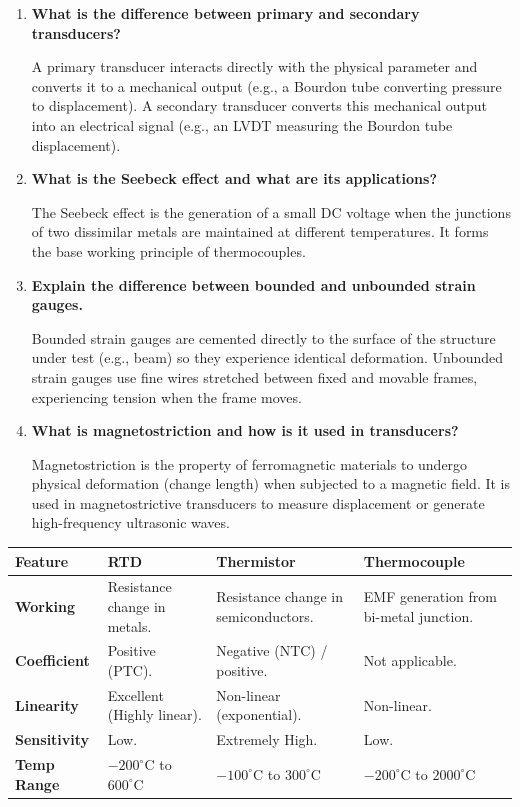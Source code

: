\documentclass[12pt,a4paper]{article}
\newcommand{\Q}[1]{\textbf{#1}\par\noindent\ignorespaces}
\renewcommand{\arraystretch}{1.45}
\begin{document}
\begin{tcolorbox}[exambox, title={\textbf{Frequently Asked / Viva Questions}}]
\begin{enumerate}[topsep=0pt, label=\textbf{Q\arabic*.}, itemsep=5pt]
  \item \Q{What is the difference between primary and secondary transducers?}
    A primary transducer interacts directly with the physical parameter and converts it to a mechanical output (e.g., a Bourdon tube converting pressure to displacement). A secondary transducer converts this mechanical output into an electrical signal (e.g., an LVDT measuring the Bourdon tube displacement).
  \item \Q{What is the Seebeck effect and what are its applications?}
    The Seebeck effect is the generation of a small DC voltage when the junctions of two dissimilar metals are maintained at different temperatures. It forms the base working principle of thermocouples.
  \item \Q{Explain the difference between bounded and unbounded strain gauges.}
    Bounded strain gauges are cemented directly to the surface of the structure under test (e.g., beam) so they experience identical deformation. Unbounded strain gauges use fine wires stretched between fixed and movable frames, experiencing tension when the frame moves.
  \item \Q{What is magnetostriction and how is it used in transducers?}
    Magnetostriction is the property of ferromagnetic materials to undergo physical deformation (change length) when subjected to a magnetic field. It is used in magnetostrictive transducers to measure displacement or generate high-frequency ultrasonic waves.
\end{enumerate}
\end{tcolorbox}

\begin{tcolorbox}[tikzbox, title={Comparison of Temperature Transducers}]
\renewcommand{\arraystretch}{1.45}
\par\noindent
\begin{tabularx}{\linewidth}{|B{2.2cm}|Y|Y|Y|}
\hline
\textbf{Feature} & \textbf{\color{myred}RTD} & \textbf{\color{myteal}Thermistor} & \textbf{\color{myamber}Thermocouple} \\
\hline
\textbf{Working} & Resistance change in metals. & Resistance change in semiconductors. & EMF generation from bi-metal junction. \\
\hline
\textbf{Coefficient} & Positive (PTC). & Negative (NTC) / positive. & Not applicable. \\
\hline
\textbf{Linearity} & Excellent (Highly linear). & Non-linear (exponential). & Non-linear. \\
\hline
\textbf{Sensitivity} & Low. & Extremely High. & Low. \\
\hline
\textbf{Temp Range} & $-200^\circ\text{C}$ to $600^\circ\text{C}$ & $-100^\circ\text{C}$ to $300^\circ\text{C}$ & $-200^\circ\text{C}$ to $2000^\circ\text{C}$ \\
\hline
\end{tabularx}
\end{tcolorbox}
\end{document}
